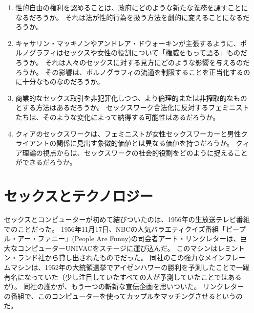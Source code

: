 \documentclass[paper=a4,book,openany]{jlreq}
\newcommand{\ig}[1]{}           %
\begin{document}
\begin{enumerate}
    \item 性的自由の権利を認めることは、政府にどのような新たな義務を課すことになるだろうか。
それは法が性的行為を扱う方法を劇的に変えることになるだろうか。
    \item キャサリン・マッキノンやアンドレア・ドウォーキン\ig{Andrea Dworkin}が主張するように、ポルノグラフィはセックスや女性の役割について「権威をもって語る」ものだろうか。
それは人々のセックスに対する見方にどのような影響を与えるのだろうか。
その影響は、ポルノグラフィの流通を制限することを正当化するのに十分なものなのだろうか。
    \item 商業的なセックス取引を非犯罪化しつつ、より倫理的または非搾取的なものとする方法はあるだろうか。
セックスワーク合法化に反対するフェミニストたちは、そのような変化によって納得する可能性はあるだろうか。
    \item クィアのセックスワークは、フェミニストが女性セックスワーカーと男性クライアントの関係に見出す象徴的価値とは異なる価値を持つだろうか。
クィア理論の視点からは、セックスワークの社会的役割をどのように捉えることができるだろうか。
    \end{enumerate}

\chapter{セックスとテクノロジー}

セックスとコンピューターが初めて結びついたのは、1956年の生放送テレビ番組でのことだった。
1956年11月17日、NBCの人気バラエティクイズ番組「ピープル・アー・ファニー」(People Are Funny)の司会者アート・リンクレターは、巨大なコンピューターUNIVACをステージに運び込んだ。
このマシンはレミントン・ランド社から貸し出されたものでだった。
同社のこの強力なメインフレームマシンは、1952年の大統領選挙でアイゼンハワーの勝利を予測したことで一躍有名になっていた（少し注目していたすべての人が予測していたことではあるが）。
同社の誰かが、もう一つの斬新な宣伝企画を思いついた。
リンクレターの番組で、このコンピューターを使ってカップルをマッチングさせるというのだ。
\end{document}
